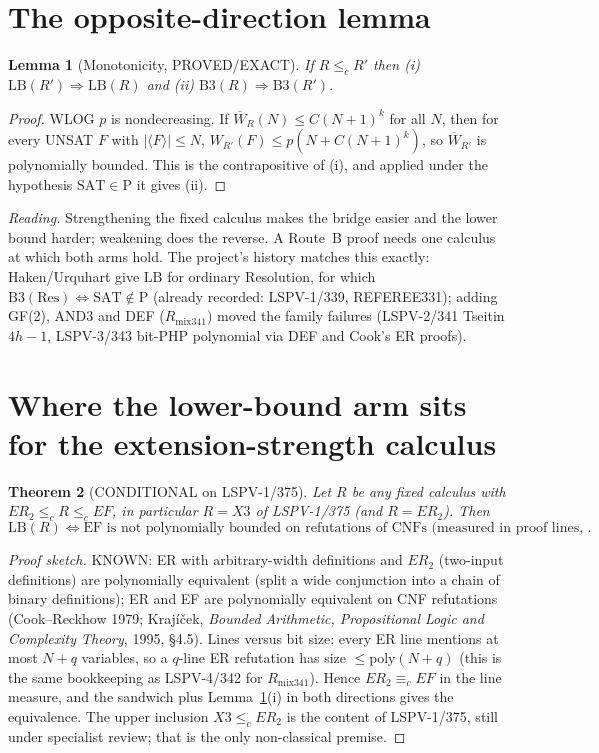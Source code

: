 \documentclass[11pt]{article}
\newtheorem{theorem}{Theorem}
\newtheorem{lemma}[theorem]{Lemma}
\theoremstyle{definition}
\newcommand{\Wbar}{\overline W}
\begin{document}
\section{The opposite-direction lemma}
\begin{lemma}[Monotonicity, PROVED/EXACT]\label{lem:mono}
If $R\le_c R'$ then (i) $\mathrm{LB}(R')\Rightarrow\mathrm{LB}(R)$ and (ii) $\mathrm{B3}(R)\Rightarrow\mathrm{B3}(R')$.
\end{lemma}
\begin{proof}
WLOG $p$ is nondecreasing. If $\Wbar_R(N)\le C(N+1)^k$ for all $N$, then for every UNSAT $F$ with
$|\langle F\rangle|\le N$, $W_{R'}(F)\le p(N+C(N+1)^k)$, so $\Wbar_{R'}$ is polynomially bounded. This is
the contrapositive of (i), and applied under the hypothesis $\mathrm{SAT}\in\mathrm P$ it gives (ii).
\end{proof}
\noindent\emph{Reading.} Strengthening the fixed calculus makes the bridge easier and the lower bound
harder; weakening does the reverse. A Route~B proof needs one calculus at which both arms hold. The
project's history matches this exactly: Haken/Urquhart give $\mathrm{LB}$ for ordinary Resolution, for which
$\mathrm{B3}(\mathrm{Res})\iff\mathrm{SAT}\notin\mathrm P$ (already recorded: LSPV-1/339, REFEREE331);
adding GF(2), AND3 and DEF ($R_{\mathrm{mix341}}$) moved the family failures (LSPV-2/341 Tseitin $4h-1$,
LSPV-3/343 bit-PHP polynomial via DEF and Cook's ER proofs).

\section{Where the lower-bound arm sits for the extension-strength calculus}
\begin{theorem}[CONDITIONAL on LSPV-1/375]\label{thm:x3}
Let $R$ be any fixed calculus with $ER_2\le_c R\le_c EF$, in particular $R=X3$ of LSPV-1/375 (and $R=ER_2$).
Then
\[
\mathrm{LB}(R)\iff \text{EF is not polynomially bounded on refutations of CNFs (measured in proof lines, hence also in size)}.
\]
\end{theorem}
\begin{proof}[Proof sketch]
KNOWN: ER with arbitrary-width definitions and $ER_2$ (two-input definitions) are polynomially
equivalent (split a wide conjunction into a chain of binary definitions); ER and EF are polynomially
equivalent on CNF refutations (Cook--Reckhow 1979; Krajíček, \emph{Bounded Arithmetic, Propositional Logic and
Complexity Theory}, 1995, \S4.5). Lines versus bit size: every ER line mentions at most $N+q$ variables, so a
$q$-line ER refutation has size $\le\mathrm{poly}(N+q)$ (this is the same bookkeeping as LSPV-4/342 for
$R_{\mathrm{mix341}}$). Hence $ER_2\equiv_c EF$ in the line measure, and the sandwich plus
Lemma~\ref{lem:mono}(i) in both directions gives the equivalence. The upper inclusion $X3\le_c ER_2$ is
the content of LSPV-1/375, still under specialist review; that is the only non-classical premise.
\end{proof}
\end{document}
